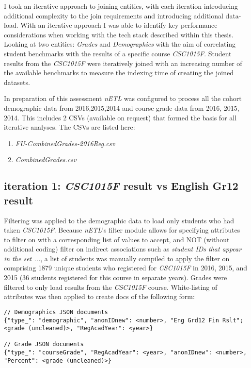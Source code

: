 I took an iterative approach to joining entities, with each iteration introducing additional complexity to the join requirements and introducing additional data-load. With an iterative approach I was able to identify key performance considerations when working with the tech stack described within this thesis. Looking at two entities: \textit{Grades} and \textit{Demographics} with the aim of correlating student benchmarks with the results of a specific course \textit{CSC1015F}. Student results from the \textit{CSC1015F} were iteratively joined with an increasing number of the available benchmarks to measure the indexing time of creating the joined datasets.

In preparation of this assessment \textit{nETL} was configured to process all the cohort demographic data from 2016,2015,2014 and course grade data from 2016, 2015, 2014. This includes 2 CSVs (available on request) that formed the basis for all iterative analyses. The CSVs are listed here:

\begin{enumerate}
    \item \textit{FU-CombinedGrades-2016Reg.csv}
    \item \textit{CombinedGrades.csv}
\end{enumerate}

\subsection{iteration 1: \textit{CSC1015F} result vs English Gr12 result}
Filtering was applied to the demographic data to load only students who had taken \textit{CSC1015F}. Because \textit{nETL}'s filter module allows for specifying attributes to filter on with a corresponding list of values to accept, and NOT (without additional coding) filter on indirect associations such as \textit{student IDs that appear in the set ...}, a list of students was manually compiled to apply the filter on comprising 1879 unique students who registered for \textit{CSC1015F} in 2016, 2015, and 2015 (36 students registered for this course in separate years). Grades were filtered to only load results from the \textit{CSC1015F} course. White-listing of attributes was then applied to create docs of the following form:

\begin{verbatim}
// Demographics JSON documents
{"type_": "demographic", "anonIDnew": <number>, "Eng Grd12 Fin Rslt"; <grade (uncleaned)>, "RegAcadYear": <year>}

// Grade JSON documents
{"type_": "courseGrade", "RegAcadYear": <year>, "anonIDnew": <number>, "Percent": <grade (uncleaned)>}
\end{verbatim}

